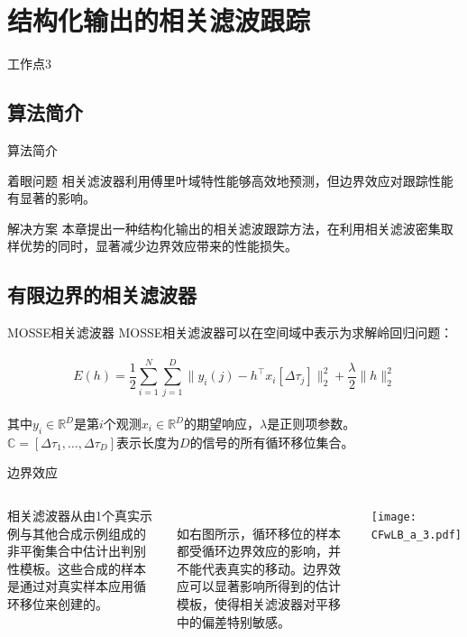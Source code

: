 \section{结构化输出的相关滤波跟踪}

\begin{frame}{工作点3}
    \tableofcontents[sections=\thesection]
\end{frame}

\subsection{算法简介}
\begin{frame}{算法简介}

\begin{block}{着眼问题}
相关滤波器利用傅里叶域特性能够高效地预测，但边界效应对跟踪性能有显著的影响。
\end{block}

\begin{block}{解决方案}
本章提出一种结构化输出的相关滤波跟踪方法，在利用相关滤波密集取样优势的同时，显著减少边界效应带来的性能损失。
\end{block}
\end{frame}


\subsection{有限边界的相关滤波器}

\begin{frame}{MOSSE相关滤波器}
MOSSE相关滤波器可以在空间域中表示为求解岭回归问题：
~\\
\begin{equation}
    E(h)= \frac{1}{2}\sum_{i=1}^N\sum_{j=1}^D\|y_i(j)-h^\top x_i[\Delta\tau_j]\|_2^2 + \frac{\lambda}{2}\|h\|_2^2
    \label{eq:CFwLB_MOSSEinSpatial}
\end{equation}
~\\
其中$y_i\in \mathbb{R}^D$是第$i$个观测$x_i\in \mathbb{R}^D$的期望响应，$\lambda$是正则项参数。$\mathbb{C} = [\Delta\tau_1,\dots,\Delta\tau_D]$表示长度为$D$的信号的所有循环移位集合。
\end{frame}

\begin{frame}{边界效应}

\begin{columns}
\centering
{}
\setlength{\parindent}{2\ccwd}

相关滤波器从由1个真实示例与其他合成示例组成的非平衡集合中估计出判别性模板。这些合成的样本是通过对真实样本应用循环移位来创建的。

~\\
如右图所示，循环移位的样本都受循环边界效应的影响，并不能代表真实的移动。边界效应可以显著影响所得到的估计模板，使得相关滤波器对平移中的偏差特别敏感。

   \texttt{[image: CFwLB\_a\_3.pdf]}
\end{columns} 
\end{frame}

